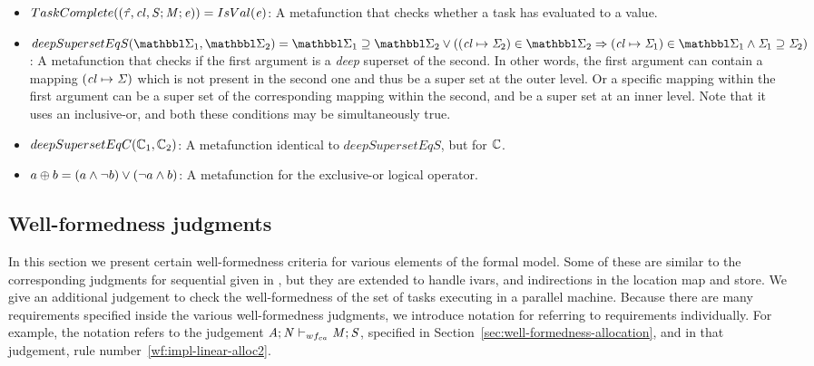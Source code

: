 \begin{itemize}


\item $TaskComplete((\mathit{\hat{\tau}}, \mathit{cl}, \mathit{S};\mathit{M};\mathit{e})) = IsVal(\mathit{e})$:
A metafunction that checks whether a task has evaluated to a value.
%


\item $deepSupersetEqS(\SENVMAP_1, \SENVMAP_2) = \SENVMAP_1 \supseteq \SENVMAP_2 \vee
( (\concretelocvar \mapsto \SENV_2) \in \SENVMAP_2 \Rightarrow
  (\concretelocvar \mapsto \SENV_1) \in \SENVMAP_1 \wedge \SENV_1 \supseteq \SENV_2
)
$:
A metafunction that checks if the first argument is a {\em deep} superset of the second.
%
In other words, the first argument can contain a mapping $(\mathit{cl} \mapsto \mathit{\Sigma})$
which is not present in the second one and thus be a super set at the outer level.
%
Or a specific mapping within the first argument can be a super set of the corresponding
mapping within the second, and be a super set at an inner level.
%
Note that it uses an inclusive-or, and both these conditions may be simultaneously true.

\item $deepSupersetEqC(\mathbb{C}_1, \mathbb{C}_2)$:
A metafunction identical to $deepSupersetEqS$, but for $\mathbb{C}$.

\item $a \oplus b = (a \wedge \neg b) \vee (\neg a \wedge b)$:
A metafunction for the exclusive-or logical operator.

\end{itemize}

\subsection{Well-formedness judgments}
\label{subsec:well-formedness-judgments}

In this section we present certain well-formedness criteria for
various elements of the formal model.
%
Some of these are similar to the corresponding judgments for sequential \seqcalc{} given
in \cite{LoCal},
but they are extended to handle ivars, and indirections in the location map and store.
%
We give an additional judgement to check the well-formedness of the set of
tasks executing in a parallel machine.
%
Because there are many requirements specified inside the various
well-formedness judgments, we introduce notation for referring
to requirements individually.
%
For example, the notation
refers to the judgement
$\mathit{A};\mathit{N} \vdash_{wf_{ca}} \mathit{M};\mathit{S}$,
specified in Section~\ref{sec:well-formedness-allocation},
and in that judgement, rule number~\ref{wf:impl-linear-alloc2}.

